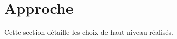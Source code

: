 \documentclass[10pt]{article}
\begin{document}















\section{Approche}
Cette section détaille les choix de haut niveau réalisés.
\end{document}
